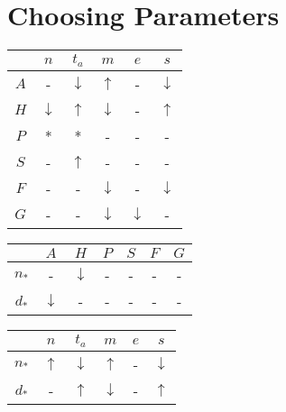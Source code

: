 \section{Choosing Parameters}\label{sec:params}

\begin{table}
\begin{tabular}{c|c|c|c|c|c}
        &   $n$             &   $t_a$           &   $m$             &   $e$             &   $s$             \\
    \hline
    $A$ &   -               &   $\downarrow$    &   $\uparrow$      &   -               &   $\downarrow$    \\
    $H$ &   $\downarrow$    &   $\uparrow$      &   $\downarrow$    &   -               &   $\uparrow$      \\
    $P$ &   *               &   *               &   -               &   -               &   -               \\
    $S$ &   -               &   $\uparrow$      &   -               &   -               &   -               \\
    $F$ &   -               &   -               &   $\downarrow$    &   -               &   $\downarrow$    \\
    $G$ &   -               &   -               &   $\downarrow$    &   $\downarrow$    &   -
\end{tabular}
\end{table}

\begin{table}
\begin{tabular}{c|c|c|c|c|c|c}
            &   $A$             &   $H$             &   $P$ &   $S$ &   $F$ &   $G$ \\
    \hline
    $n_*$   &   -               &   $\downarrow$    &   -   &   -   &   -   &   -   \\
    $d_*$   &   $\downarrow$    &   -               &   -   &   -   &   -   &   -
\end{tabular}
\end{table}

\begin{table}
\begin{tabular}{c|c|c|c|c|c}
            &   $n$             &   $t_a$           &   $m$             &   $e$             &   $s$             \\
    \hline
    $n_*$   &   $\uparrow$      &   $\downarrow$    &   $\uparrow$      &   -               &   $\downarrow$    \\
    $d_*$   &   -               &   $\uparrow$      &   $\downarrow$    &   -               &   $\uparrow$      \\
\end{tabular}
\end{table}

